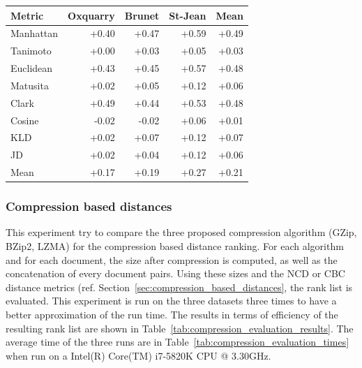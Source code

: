 \begin{table}
  \label{tab:gain_750_mfw}
  \begin{tabular}{l r r r|r}
    \toprule
    Metric & Oxquarry & Brunet & St-Jean & Mean \\
    \midrule
    Manhattan & +0.40 & +0.47 & +0.59 & +0.49 \\
    Tanimoto  & +0.00 & +0.03 & +0.05 & +0.03 \\
    Euclidean & +0.43 & +0.45 & +0.57 & +0.48 \\
    Matusita  & +0.02 & +0.05 & +0.12 & +0.06 \\
    Clark     & +0.49 & +0.44 & +0.53 & +0.48 \\
    Cosine    & -0.02 & -0.02 & +0.06 & +0.01 \\
    KLD       & +0.02 & +0.07 & +0.12 & +0.07 \\
    JD        & +0.02 & +0.04 & +0.12 & +0.06 \\
    \midrule
    Mean      & +0.17 & +0.19 & +0.27 & +0.21 \\
    \bottomrule
  \end{tabular}
\end{table}

\subsubsection{Compression based distances}

This experiment try to compare the three proposed compression algorithm (GZip, BZip2, LZMA) for the compression based distance ranking.
For each algorithm and for each document, the size after compression is computed, as well as the concatenation of every document pairs.
Using these sizes and the NCD or CBC distance metrics (ref. Section~\ref{sec:compression_based_distances}, the rank list is evaluated.
This experiment is run on the three datasets three times to have a better approximation of the run time.
The results in terms of efficiency of the resulting rank list are shown in Table~\ref{tab:compression_evaluation_results}.
The average time of the three runs are in Table~\ref{tab:compression_evaluation_times} when run on a Intel(R) Core(TM) i7-5820K CPU @ 3.30GHz.

